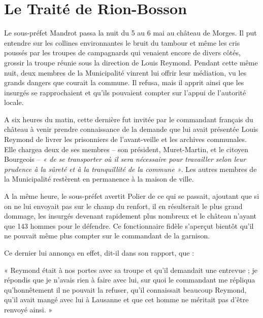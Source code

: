 \documentclass[french,twoside]{book} %
\newenvironment{quoteblock}%
  {\begin{quoting}}
  {\end{quoting}}
\newenvironment{quotebar}{%
    \def\FrameCommand{{\color{rubric!10!}\vrule width 0.5em} \hspace{0.9em}}%
    \def\OuterFrameSep{\itemsep} %
    \MakeFramed {\advance\hsize-\width \FrameRestore}
  }%
  {%
    \endMakeFramed
  }
\renewenvironment{quoteblock}%
  {%
    \savenotes
    \setstretch{0.9}
    \begin{quotebar}
  }
  {%
    \end{quotebar}
    \spewnotes
  }
\begin{document}
\section[Le Traité de Rion-Bosson]{Le Traité de Rion-Bosson}
\noindent Le sous-préfet Mandrot passa la nuit du 5 au 6 mai au château de Morges. Il put entendre sur les collines environnantes le bruit du tambour et même les cris poussés par les troupes de campagnards qui venaient encore de divers côtés, grossir la troupe réunie sous la direction de Louis Reymond. Pendant cette même nuit, deux membres de la Municipalité vinrent lui offrir leur médiation, vu les grands dangers que courait la commune. Il refusa, mais il apprit ainsi que les insurgés se rapprochaient et qu’ils pouvaient compter sur l’appui de l’autorité locale.\par
A six heures du matin, cette dernière fut invitée par le commandant français du château à venir prendre connaissance de la demande que lui avait présentée Louis Reymond de livrer les prisonniers de l’avant-veille et les archives communales. Elle chargea deux de ses membres – son président, Muret-Martin, et le citoyen Bourgeois – \emph{« de se transporter où il sera nécessaire pour travailler selon leur prudence à la sûreté et à la tranquillité de la commune »}. Les autres membres de la Municipalité restèrent en permanence à la maison de ville.\par
A la même heure, le sous-préfet avertit Polier de ce qui se passait, ajoutant que si on ne lui envoyait pas sur le champ du renfort, il en résulterait le plus grand dommage, les insurgés devenant rapidement plus nombreux et le château n’ayant que 143 hommes pour le défendre. Ce fonctionnaire fidèle s’aperçut bientôt qu’il ne pouvait même plus compter sur le commandant de la garnison.\par
Ce dernier lui annonça en effet, dit-il dans son rapport, que :\par

\begin{quoteblock}
\noindent « Reymond était à nos portes avec sa troupe et qu’il demandait une entrevue ; je répondis que je n’avais rien à faire avec lui, sur quoi le commandant me répliqua qu’honnêtement il ne pouvait la refuser, qu’il connaissait beaucoup Reymond, qu’il avait mangé avec lui à Lausanne et que cet homme ne méritait pas d’être renvoyé ainsi. »\end{quoteblock}
\end{document}
